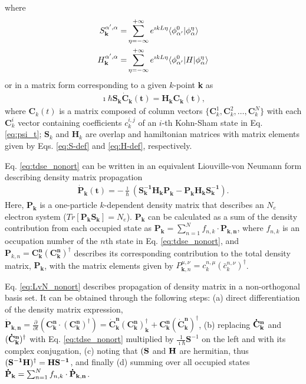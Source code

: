 \documentclass[journal=jctcce,manuscript=article,etalmode=truncate,maxauthors=10,layout=twocolumn,9pt]{achemso}   %
\begin{document}
where  
\begin{eqnarray}
\label{eq:S-def}    S^{\alpha',\alpha}_{\bf{k}} =&  \sum_{\eta=-\infty}^{+\infty} e^{\imath kL\eta} \langle \phi_{\alpha'}^0 |  \phi_\alpha^\eta \rangle \\
\label{eq:H-def}    H^{\alpha',\alpha}_{\bf{k}}  = & \sum_{\eta=-\infty}^{+\infty} e^{\imath kL\eta} \langle \phi_{\alpha'}^0 | H| \phi_\alpha^\eta \rangle 
\end{eqnarray}
or in a matrix form  corresponding  to  a given $k$-point {\bf k} as 
\begin{eqnarray}
 \imath \hbar  \mathbf{S_k  \dot C_k(t) } = \mathbf{H_k  C_k(t) },
 \label{eq:tdse_nonort}
\end{eqnarray}
where ${\mathbf C_k}(t)$ is a matrix composed of column vectors $\{\mathbf C_k^1,\mathbf C_k^2,\ldots,\mathbf C_k^N\}$
 with each $\mathbf C_k^i$  vector  containing  coefficients  $c_k^{i,j}$
 of an $i$-th  Kohn-Sham state  in Eq. \ref{eq:psi_t}; ${\mathbf S_k}$ 
 and ${\mathbf H_k}$ are  overlap and hamiltonian matrices with  matrix elements  given by 
  Eqs. \ref{eq:S-def} and \ref{eq:H-def}, respectively.


Eq. \ref{eq:tdse_nonort} can be written in an equivalent Liouville-von Neumann form describing 
 density matrix propagation
\begin{eqnarray}
 \mathbf{ \dot P_k(t) } =  -\frac{\imath}{\hbar}( \mathbf{ S^{-1}_k  H_k P_k   - P_k H_k S_k^{-1}}). 
 \label{eq:LvN_nonort}
\end{eqnarray}
Here, $\mathbf{ P_k}$ is a one-particle $k$-dependent  density matrix that describes an $N_e$ electron system 
($Tr[\mathbf{P_kS_k}]=N_e$). $\mathbf{ P_k  }$ can be calculated as
 a sum of the density  contribution from  each occupied state as
 $\mathbf{ P_k  } =  \sum_{n=1}^N f_{n,k} \cdot \mathbf { P_{k,n} } $, where $f_{n,k}$  
is  an occupation number  of  the  $n$th  state  in Eq. \ref{eq:tdse_nonort},  and 
$\mathbf P_{k,n}= \mathbf{ C_{k}^{n} (C^n_k)^\dag }$ describes  its corresponding  contribution to the total density matrix,
$\mathbf{P_k}$,  with the matrix  elements given by  
$ P_{\mathbf k,n}^{\mu,\nu} =  c_{k}^{n,\mu} (\bar c^{n,\nu}_k)^\dag   $.

Eq. \ref{eq:LvN_nonort} describes  propagation of density matrix in a non-orthogonal basis set.
It can  be  obtained through the following steps: 
(a) direct differentiation of the density matrix expression,
$\mathbf{\dot P_{k,n}} = \frac{\partial}{\partial t} \left( \mathbf{ C_{k}^{n} \cdot (C^n_k)^\dag } \right)
=\mathbf { \dot{C}_{k}^{n} (C^n_k)^\dag_k + C_{k}^{n} ( \dot {C}_k^n)^\dag} $, 
(b) replacing $\vb{\dot{C}_{k}^{n}}$ and $\vb{( \dot{C}_{k}^{n}})^\dag$ with Eq. \ref{eq:tdse_nonort} 
multiplied by  $\frac{1}{\imath \hbar} \mathbf{ S}^{-1}$ on the left  and with its complex conjugation, 
(c) noting that $(\vb{S}$  and $\vb{H}$ are hermitian, thus  $(\vb{S^{-1}H)^\dag= HS^{-1}}$,  and finally
(d) summing over all occupied  states $\vb{ \dot P_k  } =  \sum_{n=1}^N f_{n,k} \cdot \vb{ \dot P_{k,n} } $.
\end{document}
